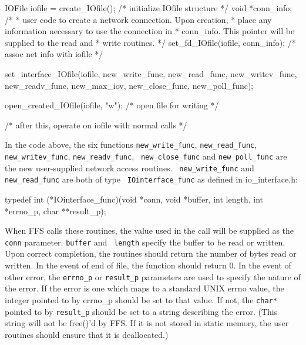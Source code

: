 \begin{Code}
{
    IOFile iofile = create_IOfile();  /* initialize IOfile structure */
    void *conn_info;
    /*
     * user code to create a network connection.  Upon creation,
     * place any information necessary to use the connection in
     * conn_info.  This pointer will be supplied to the read and 
     * write routines.
     */
    set_fd_IOfile(iofile, conn_info);  /* assoc net info with iofile */

    set_interface_IOfile(iofile, new_write_func, new_read_func,
                         new_writev_func, new_readv_func, new_max_iov,
                         new_close_func, new_poll_func);

    open_created_IOfile(iofile, "w");  /* open file for writing */

    /* after this, operate on iofile with normal calls */
}
\end{Code}
\sloppy In the code above, the six functions {\tt new\_write\_func},
{\tt new\_read\_func}, {\tt new\_writev\_func}, {\tt new\_readv\_func}, {\tt
new\_close\_func} and
{\tt new\_poll\_func} are the new user-supplied network access routines.  {\tt
new\_write\_func} and {\tt new\_read\_func} are both of type {\tt
IOinterface\_func} as defined in io\_interface.h:
\begin{Code}
typedef int (*IOinterface_func)(void *conn, void *buffer, int length,
                                int *errno_p, char **result_p);
\end{Code}
When FFS calls these routines, the value used in the 
call will be supplied as the {\tt conn} parameter.  {\tt buffer} and  {\tt
length} specify the buffer to be read or written.  Upon correct completion,
the routines should return the number of bytes read or written.  In the event
of end of file, the function should return 0.  In the event of other error,
the {\tt errno\_p} or {\tt result\_p} parameters are used to specify the nature
of the error.  If the error is one which maps to a standard UNIX errno value,
the integer pointed to by errno\_p should be set to that value.  If not, the
{\tt char*} pointed to by {\tt result\_p} should be set to a string describing
the error.  (This string will not be free()'d by FFS.  If it is not stored
in static memory, the user routines should ensure that it is deallocated.)

